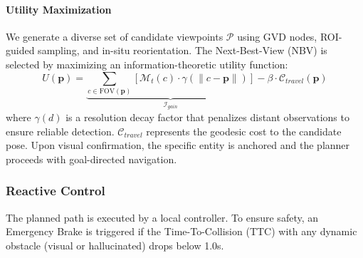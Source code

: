 \paragraph{Utility Maximization} We generate a diverse set of candidate viewpoints \(\mathcal{P}\) using GVD nodes, ROI-guided sampling, and in-situ reorientation. The Next-Best-View (NBV) is selected by maximizing an information-theoretic utility function:
\begin{equation}
    U(\mathbf{p}) = \underbrace{\sum_{c \in \text{FOV}(\mathbf{p})} [\mathcal{M}_{t}(c) \cdot \gamma(\|c-\mathbf{p}\|)]}_{\mathcal{I}_{gain}} - \beta \cdot \mathcal{C}_{travel}(\mathbf{p})
    \label{eq:nbv-utility}
\end{equation}
where \(\gamma(d)\) is a resolution decay factor that penalizes distant observations to ensure reliable detection. \(\mathcal{C}_{travel}\) represents the geodesic cost to the candidate pose. Upon visual confirmation, the specific entity is anchored and the planner proceeds with goal-directed navigation.

\subsubsection{Reactive Control}\label{reactive-control}

The planned path is executed by a local controller. To ensure safety, an
Emergency Brake is triggered if the Time-To-Collision (TTC) with any
dynamic obstacle (visual or hallucinated) drops below 1.0s.
